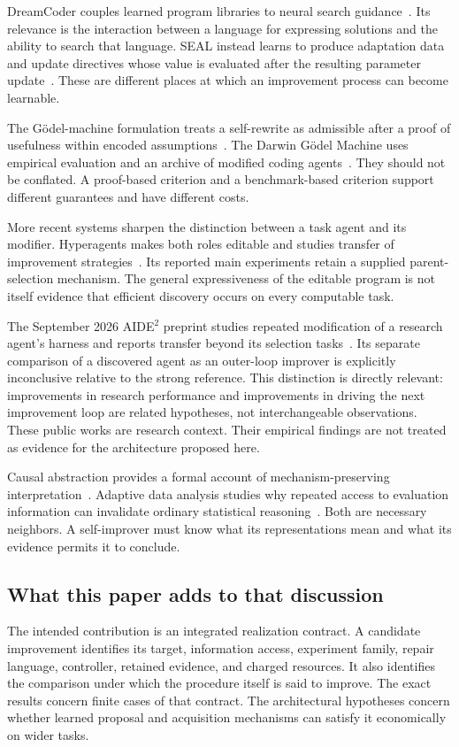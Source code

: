 \documentclass[11pt,letterpaper]{article}
\theoremstyle{plain}
\theoremstyle{definition}
\begin{document}
DreamCoder couples learned program libraries to neural search guidance~\cite{dreamcoder}. Its relevance is the interaction between a language for expressing solutions and the ability to search that language. SEAL instead learns to produce adaptation data and update directives whose value is evaluated after the resulting parameter update~\cite{seal}. These are different places at which an improvement process can become learnable.

The G\"odel-machine formulation treats a self-rewrite as admissible after a proof of usefulness within encoded assumptions~\cite{goedel}. The Darwin G\"odel Machine uses empirical evaluation and an archive of modified coding agents~\cite{dgm}. They should not be conflated. A proof-based criterion and a benchmark-based criterion support different guarantees and have different costs.

More recent systems sharpen the distinction between a task agent and its modifier. Hyperagents makes both roles editable and studies transfer of improvement strategies~\cite{hyperagents}. Its reported main experiments retain a supplied parent-selection mechanism. The general expressiveness of the editable program is not itself evidence that efficient discovery occurs on every computable task.

The September 2026 AIDE$^2$ preprint studies repeated modification of a research agent's harness and reports transfer beyond its selection tasks~\cite{aide}. Its separate comparison of a discovered agent as an outer-loop improver is explicitly inconclusive relative to the strong reference. This distinction is directly relevant: improvements in research performance and improvements in driving the next improvement loop are related hypotheses, not interchangeable observations. These public works are research context. Their empirical findings are not treated as evidence for the architecture proposed here.

Causal abstraction provides a formal account of mechanism-preserving interpretation~\cite{geiger}. Adaptive data analysis studies why repeated access to evaluation information can invalidate ordinary statistical reasoning~\cite{dwork}. Both are necessary neighbors. A self-improver must know what its representations mean and what its evidence permits it to conclude.


\subsection{What this paper adds to that discussion}
The intended contribution is an integrated realization contract. A candidate improvement identifies its target, information access, experiment family, repair language, controller, retained evidence, and charged resources. It also identifies the comparison under which the procedure itself is said to improve. The exact results concern finite cases of that contract. The architectural hypotheses concern whether learned proposal and acquisition mechanisms can satisfy it economically on wider tasks.
\end{document}
